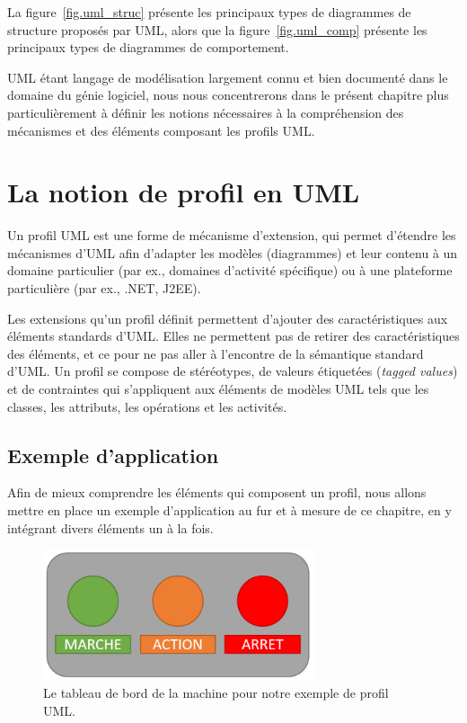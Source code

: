 
La figure~\ref{fig.uml_struc} présente les principaux types de diagrammes de structure proposés par UML,
alors que la figure~\ref{fig.uml_comp} présente les principaux types de diagrammes de comportement.

UML \'etant langage de modélisation largement connu et bien documenté dans le domaine du g\'enie logiciel,
nous nous concentrerons dans le pr\'esent chapitre plus particulièrement à définir les notions nécessaires à la compréhension des mécanismes et des éléments composant les profils UML.



\section{La notion de profil en UML}



Un profil UML est une forme de m\'ecanisme d'extension, qui
permet d'étendre les mécanismes d'UML afin d'adapter les mod\`eles (diagrammes) et leur contenu à un domaine particulier (par ex.,  domaines d'activité spécifique) ou \`a une plateforme particulière (par ex.,  .NET, J2EE).

Les extensions qu'un profil d\'efinit permettent d'ajouter des caractéristiques aux éléments standards d'UML.
Elles ne permettent pas de retirer des caractéristiques des éléments, et ce pour ne pas aller à l'encontre de la sémantique standard d'UML.
Un profil se compose  de stéréotypes, de valeurs \'etiquet\'ees (\emph{tagged values}) et de contraintes qui s'appliquent aux éléments de modèles UML tels que les classes, les attributs, les opérations et les activités.

\subsection{Exemple d'application}
Afin de mieux comprendre les éléments qui composent un profil, nous allons mettre en place un exemple d'application au fur et à mesure de ce chapitre, en y intégrant divers éléments un \`a la fois.

\begin{figure}
    \centering
    \includegraphics[width=8cm]{10_img/chap4/example.PNG}
    \caption{Le tableau de bord de la machine pour notre exemple de profil UML.}
    \label{fig.uml_ex}
\end{figure}

